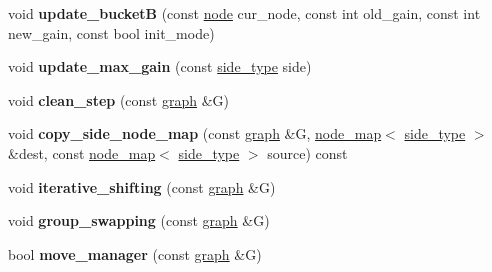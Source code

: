 \begin{DoxyCompactItemize}
\item 
\mbox{\label{classratio__cut__partition_abe5d474e6d99c7bb200071d6484b5358}} 
void {\bfseries update\+\_\+bucketB} (const \mbox{\hyperlink{classnode}{node}} cur\+\_\+node, const int old\+\_\+gain, const int new\+\_\+gain, const bool init\+\_\+mode)
\item 
\mbox{\label{classratio__cut__partition_afbe33417996a8e040d4d802a1116e134}} 
void {\bfseries update\+\_\+max\+\_\+gain} (const \mbox{\hyperlink{classratio__cut__partition_ace53442bd0c1e21fbf00858ec6f6b456}{side\+\_\+type}} side)
\item 
\mbox{\label{classratio__cut__partition_aa8e1c0cce3f126e1aa4a3aa8489986fa}} 
void {\bfseries clean\+\_\+step} (const \mbox{\hyperlink{classgraph}{graph}} \&G)
\item 
\mbox{\label{classratio__cut__partition_a8662bd1471d93d270de1c99d32ff3534}} 
void {\bfseries copy\+\_\+side\+\_\+node\+\_\+map} (const \mbox{\hyperlink{classgraph}{graph}} \&G, \mbox{\hyperlink{classnode__map}{node\+\_\+map}}$<$ \mbox{\hyperlink{classratio__cut__partition_ace53442bd0c1e21fbf00858ec6f6b456}{side\+\_\+type}} $>$ \&dest, const \mbox{\hyperlink{classnode__map}{node\+\_\+map}}$<$ \mbox{\hyperlink{classratio__cut__partition_ace53442bd0c1e21fbf00858ec6f6b456}{side\+\_\+type}} $>$ source) const
\item 
\mbox{\label{classratio__cut__partition_a758382177ff8be996d0be78a3cca069b}} 
void {\bfseries iterative\+\_\+shifting} (const \mbox{\hyperlink{classgraph}{graph}} \&G)
\item 
\mbox{\label{classratio__cut__partition_ae257dadc6cea5aef11badb68eadba0a5}} 
void {\bfseries group\+\_\+swapping} (const \mbox{\hyperlink{classgraph}{graph}} \&G)
\item 
\mbox{\label{classratio__cut__partition_a16997844577ee3284a2b6fddbbea8c37}} 
bool {\bfseries move\+\_\+manager} (const \mbox{\hyperlink{classgraph}{graph}} \&G)
\item 
\mbox{\label{classratio__cut__partition_a2dbe8b4e73ac88fe6a9a2403ca35eb3f}} 

\end{DoxyCompactItemize}
